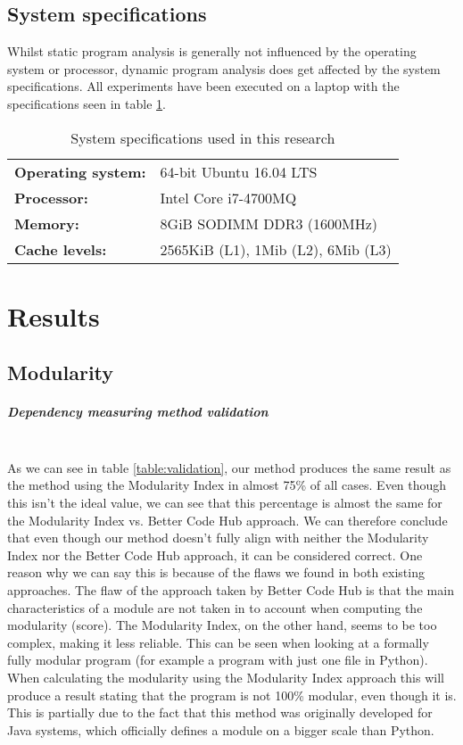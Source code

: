 \documentclass[twoside]{uva-inf-bachelor-thesis}
\newcommand{\myparagraph}[1]{\paragraph{#1}\mbox{}\\}
\begin{document}
\section{System specifications}
Whilst static program analysis is generally not influenced by the operating system or processor, dynamic program analysis does get affected by the system specifications. All experiments have been executed on a laptop with the specifications seen in table \ref{table:specifications}.
\begin{table}[H]
\centering
\caption{System specifications used in this research}
\label{table:specifications}
\begin{tabular}{ll}
\textbf{Operating system:} & 64-bit Ubuntu 16.04 LTS    \\
\textbf{Processor:}        & Intel Core i7-4700MQ       \\
\textbf{Memory:}           & 8GiB SODIMM DDR3 (1600MHz) \\
\textbf{Cache levels:}     & 2565KiB (L1), 1Mib (L2), 6Mib (L3) \\
\end{tabular}
\end{table}

\chapter{Results}
\section{Modularity}
\myparagraph{Dependency measuring method validation}
As we can see in table \ref{table:validation}, our method produces the same result as the method using the Modularity Index in almost 75\% of all cases. Even though this isn't the ideal value, we can see that this percentage is almost the same for the Modularity Index vs. Better Code Hub approach. We can therefore conclude that even though our method doesn't fully align with neither the Modularity Index nor the Better Code Hub approach, it can be considered correct. One reason why we can say this is because of the flaws we found in both existing approaches. The flaw of the approach taken by Better Code Hub is that the main characteristics of a module are not taken in to account when computing the modularity (score). The Modularity Index, on the other hand, seems to be too complex, making it less reliable. This can be seen when looking at a formally fully modular program (for example a program with just one file in Python). When calculating the modularity using the Modularity Index approach this will produce a result stating that the program is not 100\% modular, even though it is. This is partially due to the fact that this method was originally developed for Java systems, which officially defines a module on a bigger scale than Python.
\end{document}

